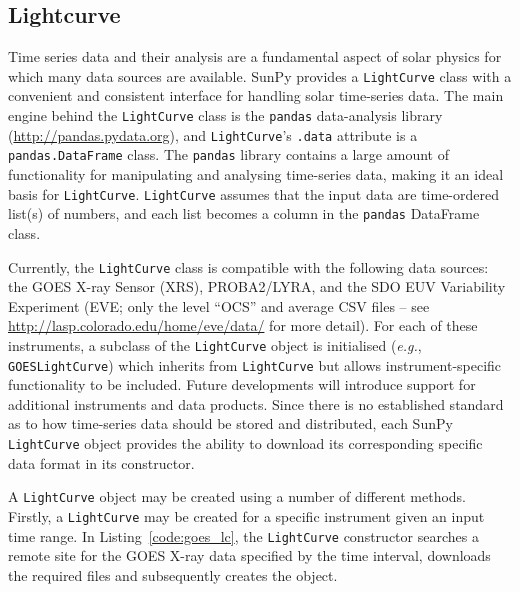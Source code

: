 \subsection{Lightcurve}\label{ssec:lightcurve}

Time series data and their analysis are a fundamental aspect of solar
physics for which many data sources are available.
SunPy provides a \texttt{LightCurve} class
with a convenient and consistent interface for handling solar time-series
data.  The main engine behind the \texttt{LightCurve} class is
the \texttt{pandas} data-analysis library (\url{http://pandas.pydata.org}),
and \texttt{LightCurve}'s
\texttt{.data} attribute is a \texttt{pandas.DataFrame} class.
The \texttt{pandas} library contains a large amount
of functionality for manipulating and analysing time-series data,
making it an ideal basis for \texttt{LightCurve}.  \texttt{LightCurve}
assumes that the input data are time-ordered list(s) of numbers, and each
list becomes a column in the \texttt{pandas} DataFrame class.

Currently, the \texttt{LightCurve} class is compatible with the
following data sources: the GOES X-ray Sensor (XRS), PROBA2/LYRA, and
the SDO EUV Variability Experiment (EVE; only the level ``OCS'' and
average CSV files -- see \url{http://lasp.colorado.edu/home/eve/data/}
for more detail).  For each of these instruments, a subclass of the
\texttt{LightCurve} object is initialised
(\textit{e.g.}, \texttt{GOESLightCurve}) which inherits from
\texttt{LightCurve} but allows instrument-specific functionality to be
included.  Future developments will introduce support for additional
instruments and data products.  Since there is no established standard
as to how time-series data
should be stored and distributed, each SunPy \texttt{LightCurve}
object provides the ability to download its corresponding specific
data format in its constructor.


A \texttt{LightCurve} object may be created using a number of different methods. 
Firstly, a \texttt{LightCurve} may be created for a specific instrument given
an input time range. In Listing~\ref{code:goes_lc}, 
the \texttt{LightCurve} constructor searches a remote site for the GOES X-ray data 
specified by the time interval, downloads the required files and subsequently 
creates the object.

